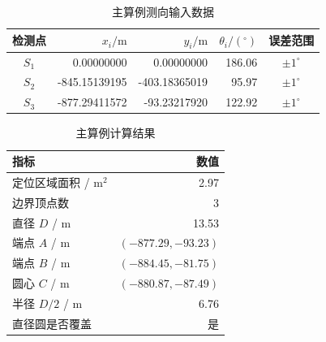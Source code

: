 \begin{table}[htbp]\centering\caption{主算例测向输入数据}\label{tab:input}\begin{tabular}{crrrc}\toprule 检测点 & $x_i/\mathrm m$ & $y_i/\mathrm m$ & $\theta_i/(^\circ)$ & 误差范围\\\midrule
$S_1$ & 0.00000000 & 0.00000000 & 186.06 & $\pm1^\circ$ \\
$S_2$ & -845.15139195 & -403.18365019 & 95.97 & $\pm1^\circ$ \\
$S_3$ & -877.29411572 & -93.23217920 & 122.92 & $\pm1^\circ$ \\
\bottomrule\end{tabular}\par{}\end{table}
\begin{table}[htbp]\centering\caption{主算例计算结果}\label{tab:result}\begin{tabular}{lr}\toprule 指标 & 数值\\\midrule
定位区域面积 / $\mathrm{m}^2$ & 2.97 \\
边界顶点数 & 3 \\
直径 $D$ / $\mathrm m$ & 13.53 \\
端点 $A$ / $\mathrm m$ & $(-877.29, -93.23)$ \\
端点 $B$ / $\mathrm m$ & $(-884.45, -81.75)$ \\
圆心 $C$ / $\mathrm m$ & $(-880.87, -87.49)$ \\
半径 $D/2$ / $\mathrm m$ & 6.76 \\
直径圆是否覆盖 & 是 \\
\bottomrule\end{tabular}\end{table}
